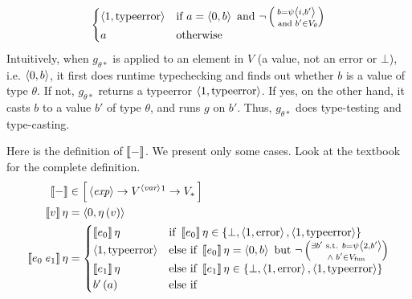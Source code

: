 \begin{enumcirc}
\[\begin{array}{c}
\begin{cases}
				\left\langle 1, \textrm{typeerror} \right\rangle & \textrm{if } a = \left\langle 0, b \right\rangle \textrm{ and }
				\neg \left( \substack{b = \psi \left\langle i, b' \right\rangle                                    \\ \textrm{ and } b' \in V_\theta} \right) \\
				a                                & \textrm{otherwise}
			\end{cases}
		\end{array}
	\]
	Intuitively, when $g_{\theta *}$ is applied to an element in $V$
	(a value, not an error or $\bot$),
	i.e. $\left\langle 0, b \right\rangle$, it first does runtime typechecking and finds out
	whether $b$ is a value of type $\theta$.
	If not, $g_{\theta *}$ returns a typeerror $\left\langle 1, \textrm{typeerror} \right\rangle$.
	If yes, on the other hand, it casts $b$ to a value $b'$ of type $\theta$, and
	runs $g$ on $b'$.
	Thus, $g_{\theta *}$ does type-testing and type-casting.
	\item
	Here is the definition of $\left\llbracket - \right\rrbracket$.
	We present only some cases.
	Look at the textbook for the complete definition.
	\begin{align*}
		\bbrackets{-}               & \in \brackets{\gram{exp} \to V^{\gram{var}}\footnotemark \to V_*} \\
		\bbrackets{v} \eta          & = \chevrons{0, \eta\prths{v}}                                     \\
		\bbrackets{e_0 \; e_1} \eta & =
		\begin{cases}
			\bbrackets{e_0} \eta             & \textrm{if } \bbrackets{e_0} \eta \in \braces{\bot, \chevrons{1, \textrm{error}}, \chevrons{1, \textrm{typeerror}}}      \\
			\chevrons{1, \textrm{typeerror}} & \textrm{else if } \bbrackets{e_0} \eta = \chevrons{0, b} \textrm{ but }
			\neg \prths{\substack{
			\exists b' \textrm{ s.t. } b = \psi \chevrons{2, b'}                                                                                                        \\
			\wedge \; b' \in \subsctext{V}{fun}}}                                                                                                                       \\
			\bbrackets{e_1} \eta             & \textrm{else if } \bbrackets{e_1} \eta \in \braces{\bot, \chevrons{1, \textrm{error}}, \chevrons{1, \textrm{typeerror}}} \\
			b'\prths{a}                      & \textrm{else if }

\end{cases}
\end{align*}
\end{enumcirc}
